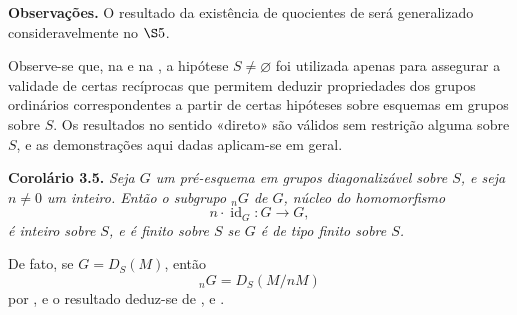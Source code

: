 \medskip
\noindent{}\textbf{Observações.}
O resultado da existência de quocientes de
 será generalizado
consideravelmente no \(\SGARefLink{sga3:viii:section:5}{\S5}\).

Observe-se que, na
 e na
, a hipótese
\(S\ne\varnothing\) foi utilizada apenas para assegurar a validade de certas
recíprocas que permitem deduzir propriedades dos grupos ordinários
correspondentes a partir de certas hipóteses sobre esquemas em grupos
sobre \(S\). Os resultados no sentido «direto» são válidos sem restrição
alguma sobre \(S\), e as demonstrações aqui dadas aplicam-se em geral.

\medskip
\noindent{}\textbf{Corolário 3.5.}
\textit{Seja \(G\) um pré-esquema em grupos diagonalizável sobre \(S\), e seja
\(n\ne0\) um inteiro. Então o subgrupo \({}_nG\) de \(G\), núcleo do
homomorfismo}
\[
  n\mathbin{\cdot}\operatorname{id}_G:G\longrightarrow G,
\]
\textit{é inteiro sobre \(S\), e é finito sobre \(S\) se \(G\) é de
tipo finito sobre \(S\).}

De fato, se \(G=D_S(M)\), então
\[
  {}_nG=D_S(M/nM)
\]
por , e o resultado deduz-se de
,
 e
.
